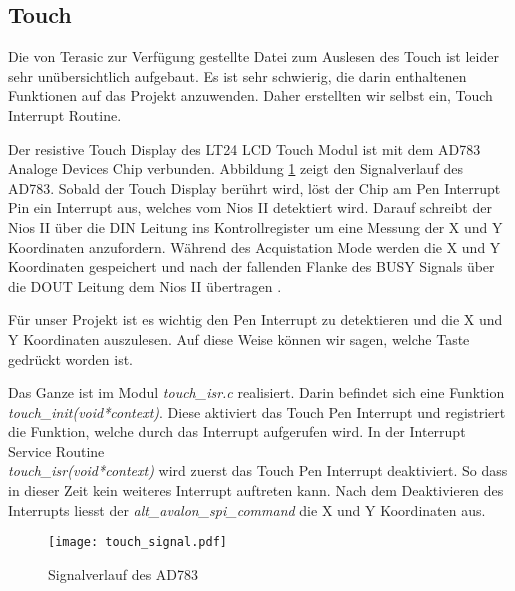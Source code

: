 \subsection{Touch}\label{subsec:touch}
 Die von Terasic zur Verfügung gestellte Datei zum Auslesen des Touch ist leider sehr unübersichtlich aufgebaut. Es ist sehr schwierig, die darin enthaltenen Funktionen auf das Projekt anzuwenden. Daher erstellten wir selbst ein, Touch Interrupt Routine. 
 
 Der resistive Touch Display des LT24 LCD Touch Modul ist mit dem AD783 Analoge Devices Chip verbunden. Abbildung \ref{img:AD783_Signalverlauf} zeigt den Signalverlauf des AD783.  Sobald der Touch Display berührt wird, löst der Chip am Pen Interrupt Pin ein Interrupt aus, welches vom Nios II detektiert wird. Darauf schreibt der Nios II über die DIN Leitung ins Kontrollregister um eine Messung der X und Y Koordinaten anzufordern. Während des Acquistation Mode werden die X und Y Koordinaten gespeichert und nach der fallenden Flanke des BUSY Signals über die DOUT Leitung dem Nios II übertragen \cite{AD7843}. 
 
 Für unser Projekt ist es wichtig den Pen Interrupt zu detektieren und die X und Y Koordinaten auszulesen. Auf diese Weise können wir sagen, welche Taste gedrückt worden ist.
 
Das Ganze ist im Modul \textit{touch\_isr.c} realisiert. Darin befindet sich eine Funktion \\ \textit{touch\_init(void*context)}. Diese aktiviert das Touch Pen Interrupt  und registriert die Funktion, welche durch das Interrupt aufgerufen wird. 
In der Interrupt Service Routine\\ \textit{touch\_isr(void*context)} wird zuerst das Touch Pen Interrupt  deaktiviert. So dass in dieser Zeit kein weiteres Interrupt auftreten kann. Nach dem Deaktivieren des Interrupts liesst der \textit{alt\_avalon\_spi\_command} die X und Y Koordinaten aus.

\begin{figure}[h!]
	\centering
	\texttt{[image: touch\_signal.pdf]}
	\caption{Signalverlauf des AD783} 
	\label{img:AD783_Signalverlauf}
\end{figure}  